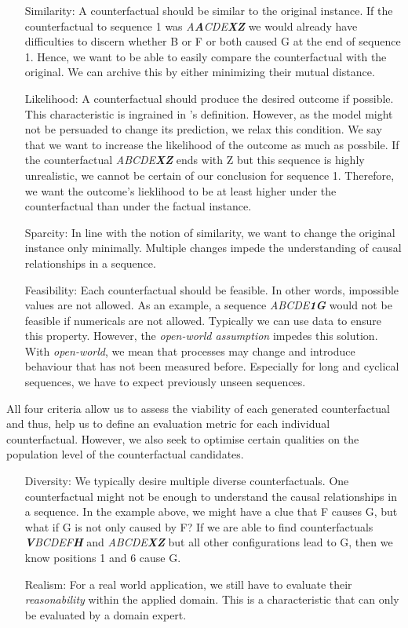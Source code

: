 \documentclass[./../../paper.tex]{subfiles}
\begin{document}
\begin{itemize}
    \item[Similarity:] A counterfactual should be similar to the original instance. If the counterfactual to sequence 1 was \textit{A\textbf{A}CDE\textbf{XZ}} we would already have difficulties to discern whether B or F or both caused G at the end of sequence 1. Hence, we want to be able to easily compare the counterfactual with the original. We can archive this by either minimizing their mutual distance.
    \item[Likelihood:] A counterfactual should produce the desired outcome if possible. This characteristic is ingrained in \citeauthor{molnar2019}'s definition. However, as the model might not be persuaded to change its prediction, we relax this condition. We say that we want to increase the likelihood of the outcome as much as possbile. If the counterfactual \textit{ABCDE\textbf{XZ}} ends with Z but this sequence is highly unrealistic, we cannot be certain of our conclusion for sequence 1. Therefore, we want the outcome's lieklihood to be at least higher under the counterfactual than under the factual instance. 
    \item[Sparcity:] In line with the notion of similarity, we want to change the original instance only minimally. Multiple changes impede the understanding of causal relationships in a sequence. 
    \item[Feasibility:] Each counterfactual should be feasible. In other words, impossible values are not allowed. As an example, a sequence \textit{ABCDE\textbf{1G}} would not be feasible if numericals are not allowed. Typically we can use data to ensure this property. However, the \emph{open-world assumption} impedes this solution. With \emph{open-world}, we mean that processes may change and introduce behaviour that has not been measured before. Especially for long and cyclical sequences, we have to expect previously unseen sequences.  
\end{itemize}

\noindent All four criteria allow us to assess the viability of each generated counterfactual and thus, help us to define an evaluation metric for each individual counterfactual. However, we also seek to optimise certain qualities on the population level of the counterfactual candidates.  

\begin{itemize}
    \item[Diversity:] We typically desire multiple diverse counterfactuals. One counterfactual might not be enough to understand the causal relationships in a sequence. In the example above, we might have a clue that F causes G, but what if G is not only caused by F? If we are able to find counterfactuals \textit{\textbf{V}BCDEF\textbf{H}} and \textit{ABCDE\textbf{XZ}} but all other configurations lead to G, then we know positions 1 and 6 cause G. 
    \item[Realism:] For a real world application, we still have to evaluate their \emph{reasonability} within the applied domain. This is a characteristic that can only be evaluated by a domain expert. 
\end{itemize}
\end{document}
